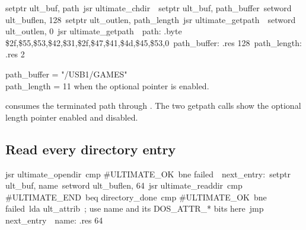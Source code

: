 \begin{listingbox}
\hspace*{2em}setptr ult\_buf, path\
\hspace*{2em}jsr ultimate\_chdir\
\
\hspace*{2em}setptr ult\_buf, path\_buffer\
\hspace*{2em}setword ult\_buflen, 128\
\hspace*{2em}setptr ult\_outlen, path\_length\
\hspace*{2em}jsr ultimate\_getpath\
\
\hspace*{2em}setword ult\_outlen, 0\
\hspace*{2em}jsr ultimate\_getpath\
\
path:        .byte \$2f,\$55,\$53,\$42,\$31,\$2f,\$47,\$41,\$4d,\$45,\$53,0\
path\_buffer: .res 128\
path\_length: .res 2
\end{listingbox}

\begin{resultbox}
path_buffer = "/USB1/GAMES"\\
path_length = 11 when the optional pointer is enabled.
\end{resultbox}

\cmd{ultimate\_chdir} consumes the terminated path through .
The two getpath calls show the optional length pointer enabled and disabled.

\subsection*{Read every directory entry}

\begin{listingbox}
\hspace*{2em}jsr ultimate\_opendir\
\hspace*{2em}cmp \#ULTIMATE\_OK\
\hspace*{2em}bne failed\
\
next\_entry:\
\hspace*{2em}setptr ult\_buf, name\
\hspace*{2em}setword ult\_buflen, 64\
\hspace*{2em}jsr ultimate\_readdir\
\hspace*{2em}cmp \#ULTIMATE\_END\
\hspace*{2em}beq directory\_done\
\hspace*{2em}cmp \#ULTIMATE\_OK\
\hspace*{2em}bne failed\
\hspace*{2em}lda ult\_attrib\
\hspace*{2em}; use name and its DOS\_ATTR\_* bits here\
\hspace*{2em}jmp next\_entry\
\
name: .res 64
\end{listingbox}

